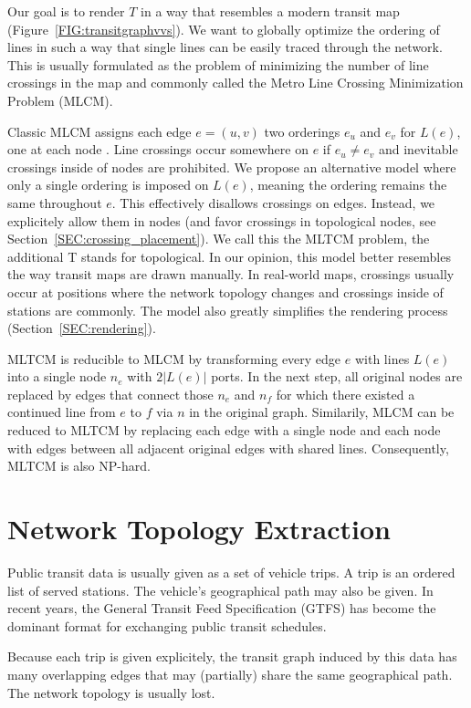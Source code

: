 \documentclass{llncs}
\begin{document}
Our goal is to render $T$ in a way that resembles a modern transit map (Figure~\ref{FIG:transitgraphvvs}). We want to globally optimize the ordering of lines in such a way that single lines can be easily traced through the network. This is usually formulated as the problem of minimizing the number of line crossings in the map and commonly called the Metro Line Crossing Minimization Problem (MLCM).

Classic MLCM assigns each edge $e=(u, v)$ two orderings $e_{u}$ and $e_{v}$ for $L(e)$, one at each node \cite{nol09}. Line crossings occur somewhere on $e$ if $e_{u} \neq e_{v}$ and inevitable crossings inside of nodes are prohibited. We propose an alternative model where only a single ordering is imposed on $L(e)$, meaning the ordering remains the same throughout $e$. This effectively disallows crossings on edges. Instead, we explicitely allow them in nodes (and favor crossings in topological nodes, see Section~\ref{SEC:crossing_placement}). We call this the MLTCM problem, the additional T stands for topological. In our opinion, this model better resembles the way transit maps are drawn manually. In real-world maps, crossings usually occur at positions where the network topology changes and crossings inside of stations are commonly. The model also greatly simplifies the rendering process (Section~\ref{SEC:rendering}).

MLTCM is reducible to MLCM by transforming every edge $e$ with lines $L(e)$ into a single node $n_e$ with $2|L(e)|$ ports. In the next step, all original nodes are replaced by edges that connect those $n_e$ and $n_f$ for which there existed a continued line from $e$ to $f$ via $n$ in the original graph. Similarily, MLCM can be reduced to MLTCM by replacing each edge with a single node and each node with edges between all adjacent original edges with shared lines. Consequently, MLTCM is also NP-hard.

%
\section{Network Topology Extraction}\label{SEC:topo}
%

Public transit data is usually given as a set of vehicle trips. A trip is an ordered list of served stations. The vehicle's geographical path may also be given. In recent years, the General Transit Feed Specification (GTFS) has become the dominant format for exchanging public transit schedules.

Because each trip is given explicitely, the transit graph induced by this data has many overlapping edges that may (partially) share the same geographical path. The network topology is usually lost.
\end{document}
